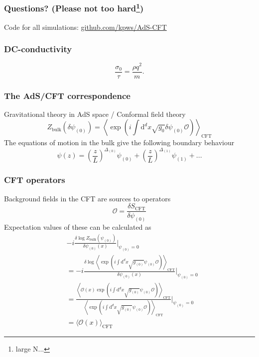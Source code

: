 \documentclass{beamer}
\renewcommand{\d}{\ensuremath{\mathrm{d}}}
\renewcommand{\i}{\ensuremath{i}}
\begin{document}
\begin{frame}


\end{frame}

\begin{frame}
\frametitle{Questions? (Please not too hard\footnote{large N...})}
Code for all simulations: \url{github.com/kpws/AdS-CFT}
\end{frame}

\begin{frame}
\frametitle{DC-conductivity}
\begin{equation}
 \frac{\sigma_0}{\tau}=\frac{\rho q^2}{m}.
\end{equation}
\end{frame}

\begin{frame}
\frametitle{The AdS/CFT correspondence}
Gravitational theory in AdS space / Conformal field theory
\begin{equation}
 Z_{\mathrm{bulk}}(\delta\psi_{(0)})=\left\langle\exp(\i\int\d^dx\sqrt{g_0}\delta\psi_{(0)}\mathcal{O})\right\rangle_{\mathrm{CFT}}\label{fulCorr}
\end{equation}
The equations of motion in the bulk give the following boundary behaviour
\begin{equation}
 \psi(z)=\left(\frac{z}{L}\right)^{\Delta_{(0)}}\psi_{(0)}+
\left(\frac{z}{L}\right)^{\Delta_{(1)}}\psi_{(1)}+...
\end{equation}
\end{frame}

\begin{frame}
\frametitle{CFT operators}
Background fields in the CFT are sources to operators
\begin{equation}
\mathcal{O}= \frac{\delta S_{\mathrm{CFT}}}{\delta \psi_{(0)}}
\end{equation}
Expectation values of these can be calculated as
\begin{equation}
\begin{split}
&-\i\frac{\delta\log Z_{\mathrm{bulk}}(\psi_{(0)})}{\delta\psi_{(0)}(x)}|_{\psi_{(0)}=0}\\
&=-\i\frac{\delta\log\left\langle\exp(\i\int\d^dx\sqrt{g_{(0)}}\psi_{(0)}\mathcal{O})\right\rangle_{\mathrm{CFT}}}{\delta\psi_{(0)}(x)}|_{\psi_{(0)}=0}\\
&=\frac{\left\langle\mathcal{O}(x)\exp(\i\int\d^dx\sqrt{g_{(0)}}\psi_{(0)}\mathcal{O})\right\rangle_{\mathrm{CFT}}}{\left\langle\exp(\i\int\d^dx\sqrt{g_{(0)}}\psi_{(0)}\mathcal{O})\right\rangle_{\mathrm{CFT}}}|_{\psi_{(0)}=0}\\
&=\langle \mathcal{O}(x) \rangle_{\mathrm{CFT}}
\end{split}
\end{equation}
\end{frame}
\end{document}

